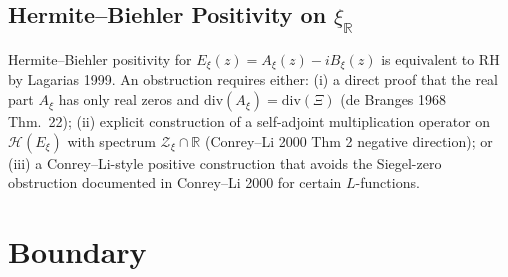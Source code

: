 \subsection{Hermite--Biehler Positivity on \(\xi_{\mathbb{R}}\)}
\label{v4-arith:w5-synth:HB-verification}

Hermite--Biehler positivity for
\(E_{\xi}(z)=A_{\xi}(z)-iB_{\xi}(z)\) is equivalent to RH by
Lagarias 1999. An obstruction requires either: (i) a direct proof that
the real part \(A_{\xi}\) has only real zeros and
\(\mathrm{div}(A_{\xi})=\mathrm{div}(\Xi)\) (de Branges 1968
Thm.~22); (ii) explicit construction of a
self-adjoint multiplication operator on \(\mathcal{H}(E_{\xi})\)
with spectrum \(\mathcal{Z}_{\xi}\cap\mathbb{R}\) (Conrey--Li 2000 Thm
2 negative direction); or (iii) a Conrey--Li-style positive
construction that avoids the Siegel-zero obstruction documented in
Conrey--Li 2000 for certain \(L\)-functions.

\section{Boundary}
\label{v4-arith:w5-synth:summary}

